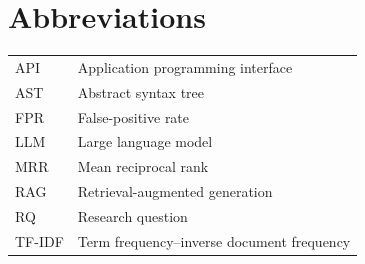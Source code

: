 \documentclass[12pt,a4paper,oneside]{report}
\begin{document}
\hypersetup{pageanchor=false}


\clearpage
\tableofcontents
\clearpage
\listoffigures
\clearpage
\listoftables
\clearpage


\chapter*{Abbreviations}
\begin{tabularx}{\textwidth}{lY}
API & Application programming interface\\
AST & Abstract syntax tree\\
FPR & False-positive rate\\
LLM & Large language model\\
MRR & Mean reciprocal rank\\
RAG & Retrieval-augmented generation\\
RQ & Research question\\
TF-IDF & Term frequency--inverse document frequency\\
\end{tabularx}

\clearpage
{}
\hypersetup{pageanchor=true}







\appendix

\end{document}
